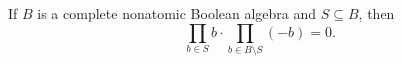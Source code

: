 If $B$ is a complete nonatomic Boolean algebra and $S \subseteq B$, then
$$\prod_{b \in S} b \cdot \prod_{b \in B \setminus S} (-b) = 0.$$